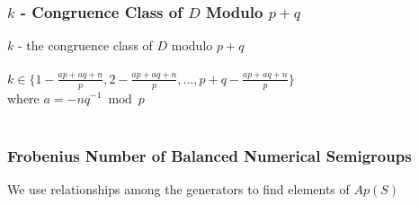 \documentclass{beamer}
\begin{document}
\begin{frame}[noframenumbering]
\begin{center}
\frametitle{$k$ - Congruence Class of $D$ Modulo $p + q$}

$k$ - the congruence class of $D$ modulo $p + q$\\

~\\

$k \in \{1 - \frac{a p + a q + n}{p}, 2 - \frac{a p + a q + n}{p}, \dots, p + q - \frac{a p + a q + n}{p}\}$\\
where $a = - n q ^ {-1} \bmod p$\\

~\\


\end{center}
\end{frame}


\begin{frame}[noframenumbering]
\begin{center}
\frametitle{Frobenius Number of Balanced Numerical Semigroups}

We use relationships among the generators to find elements of $Ap(S)$\\

~\\


\end{center}
\end{frame}

\end{document}
